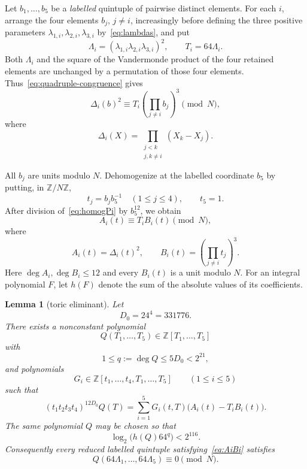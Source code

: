 \documentclass[11pt]{amsart}
\newtheorem{lemma}[theorem]{Lemma}
\theoremstyle{remark}
\newcommand{\Z}{\mathbb Z}
\begin{document}
Let $b_1,\ldots,b_5$ be a \emph{labelled} quintuple of pairwise distinct
elements. For each $i$, arrange the four elements $b_j$, $j\ne i$,
increasingly before defining the three positive parameters
$\lambda_{1,i},\lambda_{2,i},\lambda_{3,i}$ by~\eqref{eq:lambdas}, and put
\[
 \Lambda_i=(\lambda_{1,i}\lambda_{2,i}\lambda_{3,i})^2,
 \qquad T_i=64\Lambda_i.
\]
Both $\Lambda_i$ and the square of the Vandermonde product of the four
retained elements are unchanged by a permutation of those four elements.
Thus~\eqref{eq:quadruple-congruence} gives
\begin{equation}\label{eq:homogPi}
 \Delta_i(b)^2\equiv
 T_i\left(\prod_{j\ne i}b_j\right)^3\pmod N,
\end{equation}
where
\[
 \Delta_i(X)=\prod_{\substack{j<k\\j,k\ne i}}(X_k-X_j).
\]

All $b_j$ are units modulo $N$. Dehomogenize at the labelled coordinate
$b_5$ by putting, in $\Z/N\Z$,
\[
 t_j=b_jb_5^{-1}\quad(1\le j\le4),\qquad t_5=1.
\]
After division of~\eqref{eq:homogPi} by $b_5^{12}$, we obtain
\begin{equation}\label{eq:AiBi}
 A_i(t)\equiv T_iB_i(t)\pmod N,
\end{equation}
where
\[
 A_i(t)=\Delta_i(t)^2,
 \qquad
 B_i(t)=\left(\prod_{j\ne i}t_j\right)^3.
\]
Here $\deg A_i,\deg B_i\le12$ and every $B_i(t)$ is a unit modulo $N$.
For an integral polynomial $F$, let $h(F)$ denote the sum of the absolute
values of its coefficients.

\begin{lemma}[toric eliminant]\label{lem:toric}
Let
\[
 D_0=24^4=331776.
\]
There exists a nonconstant polynomial
\[
 Q(T_1,\ldots,T_5)\in\Z[T_1,\ldots,T_5]
\]
with
\begin{equation}\label{eq:Q-degree}
 1\le q:=\deg Q\le5D_0<2^{21},
\end{equation}
and polynomials
\[
 G_i\in\Z[t_1,\ldots,t_4,T_1,\ldots,T_5]\qquad(1\le i\le5)
\]
such that
\begin{equation}\label{eq:toric-certificate}
 (t_1t_2t_3t_4)^{12D_0}Q(T)
 =\sum_{i=1}^5G_i(t,T)\bigl(A_i(t)-T_iB_i(t)\bigr).
\end{equation}
The same polynomial $Q$ may be chosen so that
\begin{equation}\label{eq:Q-height-combined}
 \log_2 \bigl(h(Q)64^q\bigr)<2^{116}.
\end{equation}
Consequently every reduced labelled quintuple satisfying~\eqref{eq:AiBi}
satisfies
\begin{equation}\label{eq:Q-cong}
 Q(64\Lambda_1,\ldots,64\Lambda_5)\equiv0\pmod N.
\end{equation}
\end{lemma}
\end{document}
